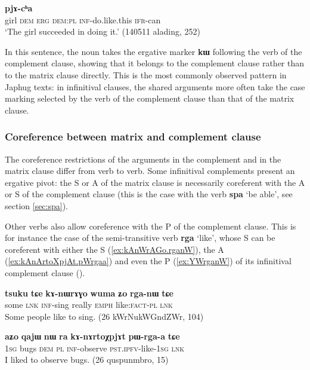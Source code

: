 \documentclass[oldfontcommands,oneside,a4paper,11pt]{article}
\newcommand{\ipa}[1]{\textbf{\phon#1}} %
\newcommand{\jpg}[2]{\ipa{#1} `#2'} %
\begin{document}
\begin{exe}
\ex \label{ex:kAstu}
\gll [\ipa{tɤɕime} 	\ipa{nɯ} 	\ipa{kɯ} 	\ipa{nɯra} 	\ipa{kɤ-stu}] 	\ipa{pjɤ-cʰa} \\
girl \textsc{dem} \textsc{erg} \textsc{dem:pl} \textsc{inf}-do.like.this \textsc{ifr}-can \\
\glt `The girl succeeded in doing it.' (140511 alading, 252)
\end{exe}

In this sentence, the noun takes the ergative marker \ipa{kɯ} following the verb of the complement clause, showing that it belongs to the complement clause rather than to the matrix clause directly. This is the most commonly observed pattern in Japhug texts: in infinitival clauses, the shared arguments more often take the case marking selected by the verb of the complement clause than that of the matrix clause.

\subsubsection{Coreference between matrix and complement clause}
The coreference restrictions of the arguments in the complement and in the matrix clause differ from verb to verb. Some infinitival complements present an ergative pivot: the S or A of the matrix clause is necessarily coreferent with the A or S of the complement clause (this is the case with the verb \ipa{spa} `be able', see section \ref{sec:spa}).

Other verbs also allow coreference with the P of the complement clause. This is for instance the case of the semi-transitive verb \jpg{rga}{like}, whose S can be coreferent with either the S  (\ref{ex:kAnWrAGo.rganW}), the A (\ref{ex:kAnArtoXpjAt.pWrgaa}) and even the P (\ref{ex:YWrganW}) of its infinitival complement clause (\citealt{jacques16relatives}).

 \begin{exe}
   \ex   \label{ex:kAnWrAGo.rganW} 
\gll
\ipa{tsuku}  	\ipa{tɕe}  	\ipa{kɤ-nɯrɤɣo}  	\ipa{wuma}  	\ipa{ʑo}  	\ipa{rga-nɯ}  	\ipa{tɕe}  \\
some \textsc{lnk} \textsc{inf}-sing really \textsc{emph} like:\textsc{fact-pl}  \textsc{lnk} \\
  \glt Some people like to sing. (26 kWrNukWGndZWr, 104)
     \end{exe}  
 
   \begin{exe}
   \ex   \label{ex:kAnArtoXpjAt.pWrgaa} 
\gll
  	\ipa{aʑo}  	\ipa{qajɯ}  	\ipa{nɯ} \ipa{ra}  	\ipa{kɤ-nɤrtoχpjɤt}  	\ipa{pɯ-rga-a}  	\ipa{tɕe}  	\\
  	\textsc{1sg} bugs \textsc{dem} \textsc{pl} \textsc{inf}-observe \textsc{pst.ipfv}-like-\textsc{1sg} \textsc{lnk}  \\
 \glt I liked to observe bugs. (26 quspunmbro, 15)
     \end{exe}  
 
\end{document}
